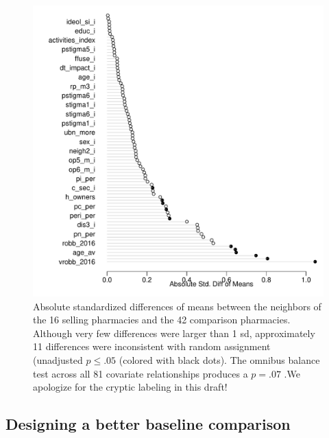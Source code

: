 \documentclass[11pt]{article}
\begin{document}
\begin{figure}[htbp!]
\centering
\includegraphics[width=.8\textwidth]{initial_balance_plot.pdf}
\caption{Absolute standardized differences of means between the neighbors of the 16 selling pharmacies and the 42 comparison pharmacies. Although very few differences were larger than 1 sd, approximately 11 differences were inconsistent with random assignment (unadjusted $p \le .05$ (colored with black dots). The omnibus balance test across all 81 covariate relationships produces a $p=.07$ \citep{hansen2008cbs}.We apologize for the cryptic labeling in this draft!} \label{fig:initbal}
\end{figure}

\subsection{Designing a better baseline comparison}
\end{document}
